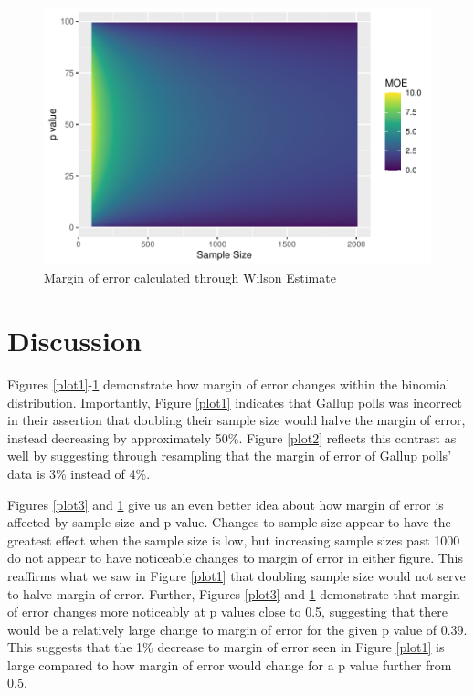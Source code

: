 \documentclass{article}\usepackage[]{graphicx}\usepackage[]{xcolor}
\begin{document}
\begin{multicols}{2}
\begin{figure}[H]
 \begin{center}
 \includegraphics[scale=0.6]{wilson_moe.pdf}
 \caption{Margin of error calculated through Wilson Estimate}
 \label{plot4}
 \end{center}
 \end{figure}




\section{Discussion}
Figures \ref{plot1}-\ref{plot4} demonstrate how margin of error changes within the binomial distribution. Importantly, Figure \ref{plot1} indicates that Gallup polls was incorrect in their assertion that doubling their sample size would halve the margin of error, instead decreasing by approximately 50\%. Figure \ref{plot2} reflects this contrast as well by suggesting through resampling that the margin of error of Gallup polls' data is 3\% instead of 4\%. 

Figures \ref{plot3} and \ref{plot4} give us an even better idea about how margin of error is affected by sample size and p value. Changes to sample size appear to have the greatest effect when the sample size is low, but increasing sample sizes past 1000 do not appear to have noticeable changes to margin of error in either figure. This reaffirms what we saw in Figure \ref{plot1} that doubling sample size would not serve to halve margin of error. Further, Figures \ref{plot3} and \ref{plot4} demonstrate that margin of error changes more noticeably at p values close to 0.5, suggesting that there would be a relatively large change to margin of error for the given p value of 0.39. This suggests that the 1\% decrease to margin of error seen in Figure \ref{plot1} is large compared to how margin of error would change for a p value further from 0.5.
\vspace{2em}


\begin{tiny}

\end{tiny}
\end{multicols}

\end{document}
